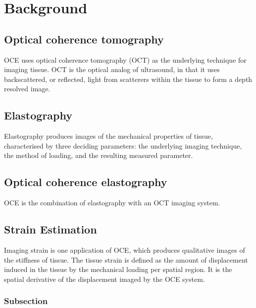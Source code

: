 \chapter{Background}

\section{Optical coherence tomography}
OCE uses optical coherence tomography (OCT) as the underlying technique for imaging tissue. OCT is the optical analog of ultrasound, in that it uses backscattered, or reflected, light from scatterers within the tissue to form a depth resolved image. 

\section{Elastography}
Elastography produces images of the mechanical properties of tissue, characterised by three deciding parameters: the underlying imaging technique, the method of loading, and the resulting measured parameter. 

\section{Optical coherence elastography}
OCE is the combination of elastography with an OCT imaging system. 


\section{Strain Estimation}
Imaging strain is one application of OCE, which produces qualitative images of the stiffness of tissue. The tissue strain is defined as the amount of displacement induced in the tissue by the mechanical loading per spatial region. It is the spatial derivative of the displacement imaged by the OCE system.

\subsection{Subsection}

